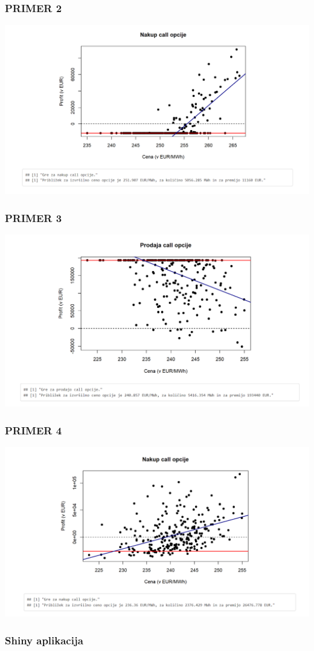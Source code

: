 \documentclass[10pt]{beamer}
\begin{document}
\begin{frame}
\frametitle{PRIMER 2}
\includegraphics[width=1\textwidth]{primer2.png}
\end{frame}

\begin{frame}
\frametitle{PRIMER 3}
\includegraphics[width=1\textwidth]{primer3.png}
\end{frame}

\begin{frame}
\frametitle{PRIMER 4}
\includegraphics[width=1\textwidth]{primer4.png}
\end{frame}

\begin{frame}
\frametitle{Shiny aplikacija}

\end{frame}
\end{document}
